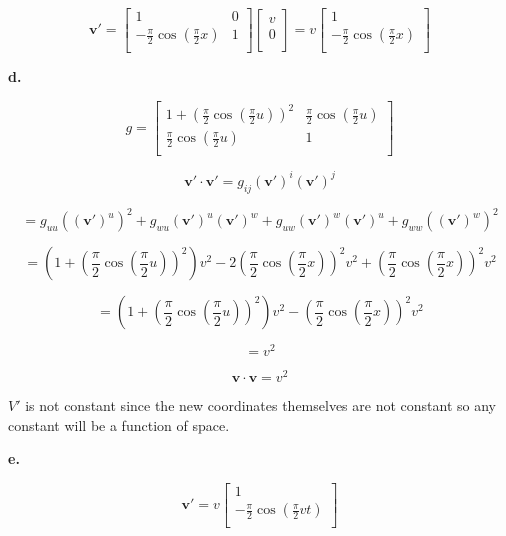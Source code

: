 \documentclass[12pt]{article}
\begin{document}
\[
      \mathbf{v}' =
      \begin{bmatrix}
            1                                   & 0 \\
            -\frac{\pi}{2} \cos(\frac{\pi}{2}x) & 1 \\
      \end{bmatrix}\begin{bmatrix}
            v \\
            0 \\
      \end{bmatrix} =
      v \begin{bmatrix}
            1                                   \\
            -\frac{\pi}{2} \cos(\frac{\pi}{2}x) \\
      \end{bmatrix}
\]

\textbf{d.}

\[
      g = \begin{bmatrix}
            1 + {(\frac{\pi}{2} \cos(\frac{\pi}{2}u))}^2 & \frac{\pi}{2} \cos(\frac{\pi}{2}u) \\
            \frac{\pi}{2} \cos(\frac{\pi}{2}u)           & 1                                  \\
      \end{bmatrix}
\]


\[
      \mathbf{v}' \cdot \mathbf{v}'= g_{i j} {(\mathbf{v}')}^i {(\mathbf{v}')}^j
\]

\[
      = g_{u u} {({(\mathbf{v}')}^u)}^2
      + g_{w u} {(\mathbf{v}')}^u {(\mathbf{v}')}^w
      + g_{u w} {(\mathbf{v}')}^w {(\mathbf{v}')}^u
      + g_{w w} {({(\mathbf{v}')}^w)}^2
\]

\[
      = (1 + {(\frac{\pi}{2} \cos(\frac{\pi}{2}u))}^2)v^2
      - 2 {(\frac{\pi}{2} \cos(\frac{\pi}{2}x))}^2 v^2
      + {(\frac{\pi}{2} \cos(\frac{\pi}{2}x))}^2 v^2
\]

\[
      = (1 + {(\frac{\pi}{2} \cos(\frac{\pi}{2}u))}^2)v^2
      - {(\frac{\pi}{2} \cos(\frac{\pi}{2}x))}^2 v^2
\]

\[
      = v^2
\]

\[
      \mathbf{v} \cdot \mathbf{v} = v^2
\]

$V'$ is not constant since the new coordinates themselves are not constant so any constant will be a function of space.

\textbf{e.}

\[
      \mathbf{v}' =
      v \begin{bmatrix}
            1                                     \\
            -\frac{\pi}{2} \cos(\frac{\pi}{2}v t) \\
      \end{bmatrix}
\]
\end{document}

